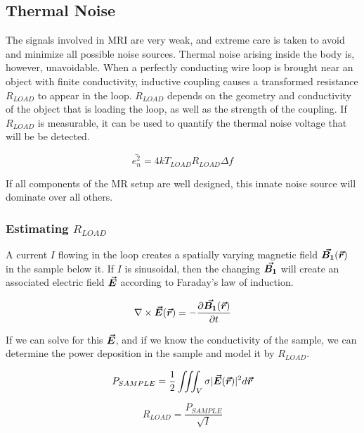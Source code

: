 \subsection{Thermal Noise}
The signals involved in MRI are very weak, and extreme care is taken to avoid and minimize all possible noise
sources. Thermal noise arising inside the body is, however, unavoidable. When a perfectly conducting wire loop is
brought near an object with finite conductivity, inductive coupling causes a transformed resistance $R_{LOAD}$ to appear
in the loop. $R_{LOAD}$ depends on the geometry and conductivity of the object that is loading the loop, as well as the
strength of the coupling. If $R_{LOAD}$ is measurable, it can be used to quantify the thermal noise voltage that will be be
detected.

\begin{equation}\label{eq:thermal_noise}
    \bar{e_n^2} = 4 k T_{LOAD} R_{LOAD} \Delta f
\end{equation}

If all components of the MR setup are well designed, this innate noise source will dominate over all others.

\subsubsection{Estimating $R_{LOAD}$}

A current $I$ flowing in the loop creates a spatially varying magnetic field $\bm{\vec{B_1}}(\bm{\vec{r}})$ in the sample below it. If $I$
is sinusoidal, then the changing $\bm{\vec{B_1}}$ will create an associated electric field $\bm{\vec{E}}$ according to Faraday's
law of induction.

\begin{equation}\label{eq:differential_faraday}
    \nabla \times \bm{\vec{E}}(\bm{\vec{r}}) = - \frac{\partial \bm{\vec{B_1}}(\bm{\vec{r}})}{\partial t}
\end{equation}

If we can solve for this $\bm{\vec{E}}$, and if we know the conductivity of the sample, we can determine the power
deposition in the sample and model it by $R_{LOAD}$.

\begin{equation}\label{eq:P_sample}
    P_{SAMPLE} = \frac{1}{2} \iiint_V \sigma |\bm{\vec{E}}(\bm{\vec{r}})|^2 d\bm{\vec{r}}
\end{equation} 

\begin{equation}
    R_{LOAD} = \frac{P_{SAMPLE}}{\sqrt{I}} 
\end{equation}

